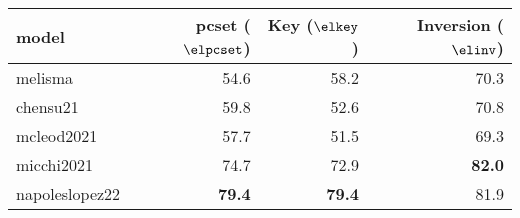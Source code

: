 \begin{tabular}{l|rrr}
model          & \gls{pcset} ($\elpcset$) & Key ($\elkey$) & Inversion ($\elinv$)  \\ \hline
melisma        & 54.6 & 58.2 & 70.3 \\
chensu21       & 59.8 & 52.6 & 70.8 \\
mcleod2021     & 57.7 & 51.5 & 69.3 \\
micchi2021     & 74.7 & 72.9 & \textbf{82.0} \\
napoleslopez22 & \textbf{79.4} & \textbf{79.4} & 81.9
\end{tabular}
